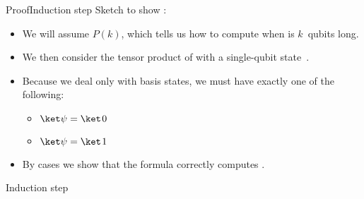 {\begin{frame}{Proof}{Induction step}
Sketch to show :
\begin{itemize}
    \item We will assume $P(k)$, which tells us how to compute \ket{\W} when \W{} is $k$~qubits long.
    \item We then consider the tensor product of \ket{\W} with a single-qubit state~\QState{}.
    \item Because we deal only with basis states, we must have exactly one of the following:
    \begin{itemize}
        \item $\QState{}=\QZero{}$
        \item $\QState{}=\QOne{}$
    \end{itemize}
    \item By cases we show that the formula correctly computes .
\end{itemize}

\end{frame}

\begin{frame}{Induction step}

\vrule width 0pt depth 1em


\end{frame}}
